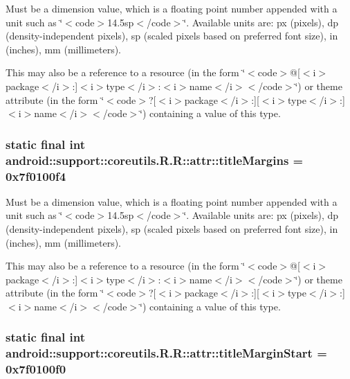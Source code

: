 Must be a dimension value, which is a floating point number appended with a unit such as \char`\"{}$<$code$>$14.5sp$<$/code$>$\char`\"{}. Available units are: px (pixels), dp (density-independent pixels), sp (scaled pixels based on preferred font size), in (inches), mm (millimeters). 

This may also be a reference to a resource (in the form \char`\"{}$<$code$>$@\mbox{[}$<$i$>$package$<$/i$>$:\mbox{]}$<$i$>$type$<$/i$>$:$<$i$>$name$<$/i$>$$<$/code$>$\char`\"{}) or theme attribute (in the form \char`\"{}$<$code$>$?\mbox{[}$<$i$>$package$<$/i$>$:\mbox{]}\mbox{[}$<$i$>$type$<$/i$>$:\mbox{]}$<$i$>$name$<$/i$>$$<$/code$>$\char`\"{}) containing a value of this type. \hypertarget{classandroid_1_1support_1_1coreutils_1_1_r_1_1attr_38cc1a395723d7a1c1f30e098e6b4624}{
\subsubsection[{titleMargins}]{\setlength{\rightskip}{0pt plus 5cm}static final int android::support::coreutils.R.R::attr::titleMargins = 0x7f0100f4}}
\label{classandroid_1_1support_1_1coreutils_1_1_r_1_1attr_38cc1a395723d7a1c1f30e098e6b4624}


Must be a dimension value, which is a floating point number appended with a unit such as \char`\"{}$<$code$>$14.5sp$<$/code$>$\char`\"{}. Available units are: px (pixels), dp (density-independent pixels), sp (scaled pixels based on preferred font size), in (inches), mm (millimeters). 

This may also be a reference to a resource (in the form \char`\"{}$<$code$>$@\mbox{[}$<$i$>$package$<$/i$>$:\mbox{]}$<$i$>$type$<$/i$>$:$<$i$>$name$<$/i$>$$<$/code$>$\char`\"{}) or theme attribute (in the form \char`\"{}$<$code$>$?\mbox{[}$<$i$>$package$<$/i$>$:\mbox{]}\mbox{[}$<$i$>$type$<$/i$>$:\mbox{]}$<$i$>$name$<$/i$>$$<$/code$>$\char`\"{}) containing a value of this type. \hypertarget{classandroid_1_1support_1_1coreutils_1_1_r_1_1attr_f647c1e76bd1c879f0fbc42791d96993}{
\subsubsection[{titleMarginStart}]{\setlength{\rightskip}{0pt plus 5cm}static final int android::support::coreutils.R.R::attr::titleMarginStart = 0x7f0100f0}}
\label{classandroid_1_1support_1_1coreutils_1_1_r_1_1attr_f647c1e76bd1c879f0fbc42791d96993}


